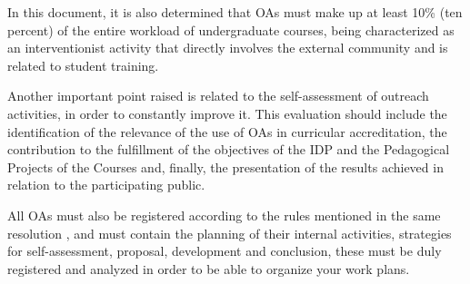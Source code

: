 
In this document, it is also determined that \acp{OA} must make up at least 10\% (ten percent) of the entire workload of undergraduate courses, being characterized as an interventionist activity that directly involves the external community and is related to student training.


Another important point raised is related to the self-assessment of outreach activities, in order to constantly improve it. 
This evaluation should include the identification of the relevance of the use of \acp{OA} in curricular accreditation, the contribution to the fulfillment of the objectives of the \ac{IDP} and the Pedagogical Projects of the Courses and, finally, the presentation of the results achieved in relation to the participating public.


All \acp{OA} must also be registered according to the rules mentioned in the same resolution \cite{ministerioSuperiorExtensao}, and must contain the planning of their internal activities, strategies for self-assessment, proposal, development and conclusion, these must be duly registered and analyzed in order to be able to organize your work plans.

